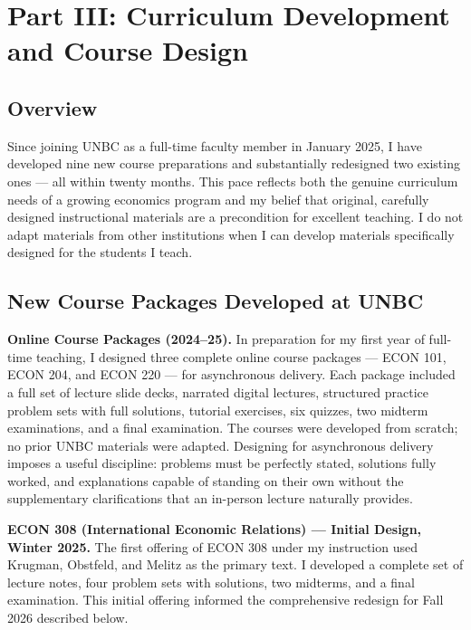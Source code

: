 \documentclass[11pt,letterpaper]{article}
\begin{document}
\section{Part III: Curriculum Development and Course Design}

\subsection{Overview}

Since joining UNBC as a full-time faculty member in January 2025, I have developed nine new course preparations and substantially redesigned two existing ones --- all within twenty months. This pace reflects both the genuine curriculum needs of a growing economics program and my belief that original, carefully designed instructional materials are a precondition for excellent teaching. I do not adapt materials from other institutions when I can develop materials specifically designed for the students I teach.

\subsection{New Course Packages Developed at UNBC}

\textbf{Online Course Packages (2024--25).} In preparation for my first year of full-time teaching, I designed three complete online course packages --- ECON 101, ECON 204, and ECON 220 --- for asynchronous delivery. Each package included a full set of lecture slide decks, narrated digital lectures, structured practice problem sets with full solutions, tutorial exercises, six quizzes, two midterm examinations, and a final examination. The courses were developed from scratch; no prior UNBC materials were adapted. Designing for asynchronous delivery imposes a useful discipline: problems must be perfectly stated, solutions fully worked, and explanations capable of standing on their own without the supplementary clarifications that an in-person lecture naturally provides.

\textbf{ECON 308 (International Economic Relations) --- Initial Design, Winter 2025.} The first offering of ECON 308 under my instruction used Krugman, Obstfeld, and Melitz as the primary text. I developed a complete set of lecture notes, four problem sets with solutions, two midterms, and a final examination. This initial offering informed the comprehensive redesign for Fall 2026 described below.
\end{document}
